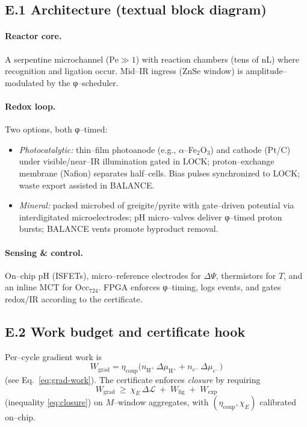 \documentclass[11pt]{article}
\begin{document}
\subsection*{E.1 Architecture (textual block diagram)}
\paragraph{Reactor core.}
A serpentine microchannel ($\mathrm{Pe}\gg 1$) with reaction chambers (tens of nL) where recognition and ligation occur. Mid–IR ingress (ZnSe window) is amplitude–modulated by the φ–scheduler.

\paragraph{Redox loop.}
Two options, both φ–timed:
\begin{itemize}
\item \emph{Photocatalytic:} thin–film photoanode (e.g., $\alpha$–Fe$_2$O$_3$) and cathode (Pt/C) under visible/near–IR illumination gated in \textsf{LOCK}; proton–exchange membrane (Nafion) separates half–cells. Bias pulses synchronized to \textsf{LOCK}; waste export assisted in \textsf{BALANCE}.
\item \emph{Mineral:} packed microbed of greigite/pyrite with gate–driven potential via interdigitated microelectrodes; pH micro–valves deliver φ–timed proton bursts; \textsf{BALANCE} vents promote byproduct removal.
\end{itemize}

\paragraph{Sensing \& control.}
On–chip pH (ISFETs), micro–reference electrodes for $\Delta\Psi$, thermistors for $T$, and an inline MCT for $\mathrm{Occ}_{724}$. FPGA enforces φ–timing, logs events, and gates redox/IR according to the certificate.

\subsection*{E.2 Work budget and certificate hook}
Per–cycle gradient work is
\[
W_{\mathrm{grad}}=\eta_{\mathrm{coup}}\Big(n_{\mathrm{H}^+}\,\Delta \mu_{\mathrm{H}^+}+n_{e^-}\,\Delta \mu_{e^-}\Big)
\]
(see Eq.~\eqref{eq:grad-work}). The certificate enforces \emph{closure} by requiring
\[
W_{\mathrm{grad}}\ \ge\ \chi_E\,\Delta \mathcal{L}\;+\;W_{\mathrm{lig}}\;+\;W_{\mathrm{exp}}
\]
(inequality \eqref{eq:closure}) on $M$–window aggregates, with $(\eta_{\mathrm{coup}},\chi_E)$ calibrated on–chip.
\end{document}
